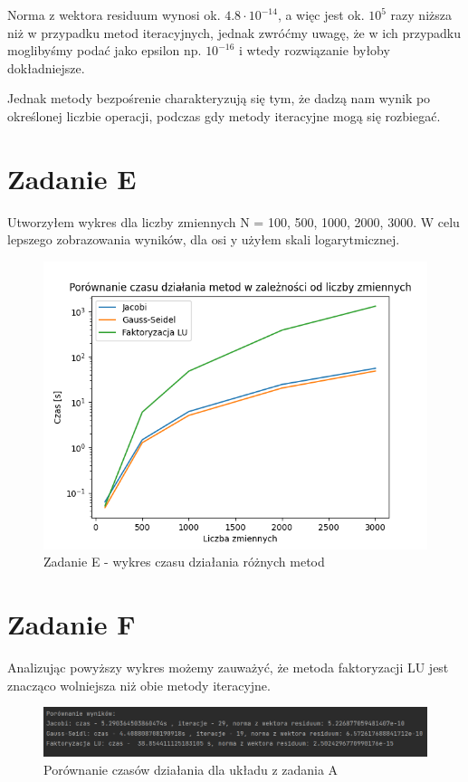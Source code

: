 \documentclass[fleqn]{article}
\begin{document}
    \noindent Norma z wektora residuum wynosi ok. $4.8 \cdot 10^{-14} $, 
    a więc jest ok. $10^5 $ razy niższa niż w przypadku metod iteracyjnych, jednak zwróćmy uwagę,
    że w ich przypadku moglibyśmy podać jako epsilon np. $10^{-16}$ i wtedy rozwiązanie byłoby dokładniejsze.
    
    \noindent Jednak metody bezpośrenie charakteryzują się tym, że dadzą nam wynik po określonej liczbie operacji,
    podczas gdy metody iteracyjne mogą się rozbiegać.
    \newpage
    \section{Zadanie E}
    Utworzyłem wykres dla liczby zmiennych N = {100, 500, 1000, 2000, 3000}.
    W celu lepszego zobrazowania wyników, dla osi y użyłem skali logarytmicznej.


    \begin{figure}[h]

        \centering
        \includegraphics[width=\textwidth]{test.png}
        \centering
        \caption{Zadanie E - wykres czasu działania różnych metod}

    \end{figure}
    \newpage
    \section{Zadanie F}
    Analizując powyższy wykres możemy zauważyć, że metoda faktoryzacji LU jest znacząco wolniejsza
    niż obie metody iteracyjne.
    \begin{figure}[h]

        \centering
        \includegraphics[width=\textwidth]{LUJacGS.png}
        \centering
        \caption{Porównanie czasów działania dla układu z zadania A}

    \end{figure}
\end{document}
